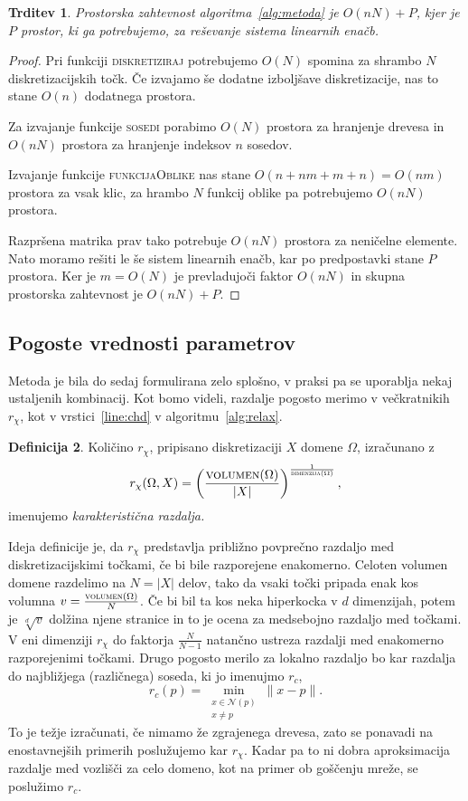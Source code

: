 \documentclass[12pt,a4paper,twoside]{article}
\theoremstyle{definition} %
\newtheorem{definicija}{Definicija}[section]
\theoremstyle{plain} %
\newtheorem{trditev}[definicija]{Trditev}
\numberwithin{equation}{section}
\newcommand{\Nc}{\mathcal{N}}
\begin{document}
\begin{trditev}
  Prostorska zahtevnost algoritma~\ref{alg:metoda} je $O(nN) + P$, kjer je $P$
  prostor, ki ga potrebujemo, za reševanje sistema linearnih enačb.
\end{trditev}
\begin{proof}
Pri funkciji \textsc{diskretiziraj} potrebujemo $O(N)$ spomina za shrambo $N$
diskretizacijskih točk. Če izvajamo še dodatne izboljšave diskretizacije, nas to
stane $O(n)$ dodatnega prostora.

Za izvajanje funkcije \textsc{sosedi} porabimo $O(N)$ prostora za hranjenje drevesa
in $O(nN)$ prostora za hranjenje indeksov $n$ sosedov.

Izvajanje funkcije \textsc{funkcijaOblike} nas stane $O(n+nm+m+n) = O(nm)$
prostora za vsak klic, za hrambo $N$ funkcij oblike pa potrebujemo $O(nN)$
prostora.

Razpršena matrika prav tako potrebuje $O(nN)$ prostora za neničelne elemente.
Nato moramo rešiti le še sistem linearnih enačb, kar po predpostavki stane $P$
prostora. Ker je $m = O(N)$ je prevladujoči faktor $O(nN)$ in skupna prostorska
zahtevnost je $O(nN) + P$.
\end{proof}

\subsection{Pogoste vrednosti parametrov}
Metoda je bila do sedaj formulirana zelo splošno, v praksi pa se uporablja nekaj
ustaljenih kombinacij. Kot bomo videli, razdalje pogosto merimo v večkratnikih
$r_\chi$, kot v vrstici~\ref{line:chd} v algoritmu~\ref{alg:relax}.
\begin{definicija}
  Količino $r_\chi$, pripisano diskretizaciji $X$ domene $\Omega$, izračunano z \[
    r_\chi(\Omega, X) = \left( \frac{\textsc{volumen}(\Omega)}{|X|}
    \right)^\frac{1}{\textsc{dimenzija}(\Omega)},
  \]
  imenujemo \emph{karakteristična razdalja.}
\end{definicija}
Ideja definicije je, da $r_\chi$ predstavlja približno povprečno razdaljo med
diskretizacijskimi točkami, če bi bile razporejene enakomerno. Celoten volumen
domene razdelimo na $N = |X|$ delov, tako da vsaki točki pripada enak kos
volumna $v = \frac{\textsc{volumen}(\Omega)}{N}$. Če bi
bil ta kos neka hiperkocka v $d$ dimenzijah, potem je $\sqrt[d]{v}$ dolžina
njene stranice in to je ocena za medsebojno razdaljo med točkami.
V eni dimenziji $r_\chi$ do faktorja $\frac{N}{N-1}$ natančno ustreza razdalji
med enakomerno razporejenimi točkami.
Drugo pogosto merilo za lokalno razdaljo bo kar razdalja do najbližjega
(različnega) soseda, ki jo imenujmo $r_c$,
\begin{equation}
  r_c(p) = \min_{\substack{x \in \Nc(p) \\ x \neq p}} \|x-p\|.
  \label{eq:min-dist}
\end{equation}
To je težje izračunati, če nimamo že
zgrajenega drevesa, zato se ponavadi na enostavnejših primerih poslužujemo kar
$r_\chi$. Kadar pa to ni dobra aproksimacija razdalje med vozlišči za celo
domeno, kot na primer ob goščenju mreže, se poslužimo $r_c$.
\end{document}
